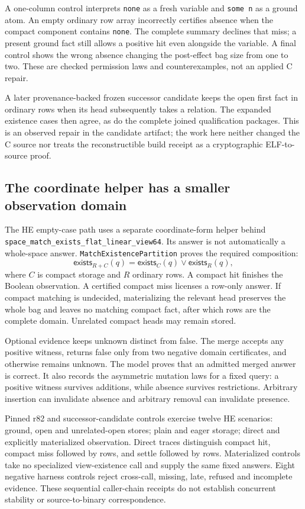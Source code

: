 \documentclass[11pt,a4paper]{article}
\newcommand{\code}[1]{\nolinkurl{#1}}
\begin{document}
A one-column control interprets \code{none} as a fresh variable and
\verb|some n| as a ground atom. An empty ordinary row array incorrectly
certifies absence when the compact component contains \code{none}. The
complete summary declines that miss; a present ground fact still allows a
positive hit even alongside the variable. A final control shows the wrong
absence changing the post-effect bag size from one to two. These are checked
permission laws and counterexamples, not an applied C repair.

A later provenance-backed frozen successor candidate keeps the open first fact in ordinary
rows when its head subsequently takes a relation. The expanded existence
cases then agree, as do the complete joined qualification packages. This is
an observed repair in the candidate artifact; the work here neither changed
the C source nor treats the reconstructible build receipt as a cryptographic
ELF-to-source proof.

\subsection{The coordinate helper has a smaller observation domain}

The HE empty-case path uses a separate coordinate-form helper behind
\code{space_match_exists_flat_linear_view64}. Its answer is not automatically
a whole-space answer. \code{MatchExistencePartition} proves the required
composition:
\[
 \mathsf{exists}_{R+C}(q)=
 \mathsf{exists}_{C}(q)\lor\mathsf{exists}_{R}(q),
\]
where $C$ is compact storage and $R$ ordinary rows. A compact hit finishes
the Boolean observation. A certified compact miss licenses a row-only answer.
If compact matching is undecided, materializing the relevant head preserves
the whole bag and leaves no matching compact fact, after which rows are the
complete domain. Unrelated compact heads may remain stored.

Optional evidence keeps unknown distinct from false. The merge accepts any
positive witness, returns false only from two negative domain certificates,
and otherwise remains unknown. The model proves that an admitted merged
answer is correct. It also records the asymmetric mutation laws for a fixed
query: a positive witness survives additions, while absence survives
restrictions. Arbitrary insertion can invalidate absence and arbitrary removal
can invalidate presence.

Pinned r82 and successor-candidate controls exercise twelve HE scenarios:
ground, open and unrelated-open stores; plain and eager storage; direct and
explicitly materialized observation. Direct traces distinguish compact hit,
compact miss followed by rows, and settle followed by rows. Materialized
controls take no specialized view-existence call and supply the same fixed
answers. Eight negative harness controls reject cross-call, missing, late,
refused and incomplete evidence. These sequential caller-chain receipts do
not establish concurrent stability or source-to-binary correspondence.
\end{document}
